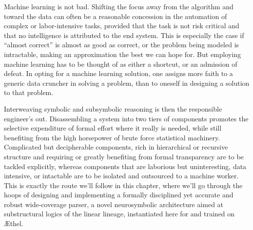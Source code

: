 Machine learning is not bad.
Shifting the focus away from the algorithm and toward the data can often be a reasonable concession in the automation of complex or labor-intensive tasks, provided that the task is not risk critical and that no intelligence is attributed to the end system.
This is especially the case if ``almost correct'' is almost as good as correct, or the problem being modeled is intractable, making an approximation the best we can hope for.
But employing machine learning has to be thought of as either a shortcut, or an admission of defeat.
In opting for a machine learning solution, one assigns more faith to a generic data cruncher in solving a problem, than to oneself in designing a solution to that problem.

Interweaving symbolic and subsymbolic reasoning is then the responsible engineer's out.
Disassembling a system into two tiers of components promotes the selective expenditure of formal effort where it really is needed, while still benefiting from the  high horsepower of brute force statistical machinery.
Complicated but decipherable components, rich in hierarchical or recursive structure and requiring or greatly benefiting from formal transparency are to be tackled explicitly, whereas components that are laborious but uninteresting, data intensive, or intactable are to be isolated and outsourced to a machine worker.
This is exactly the route we'll follow in this chapter, where we'll go through the hoops of designing and implementing a formally disciplined yet accurate and robust wide-coverage parser, a novel neurosymbolic architecture aimed at substructural logics of the linear lineage, instantiated here for \NLPplus{} and trained on \AE thel.

 

%
%
%
%
%
%
%
